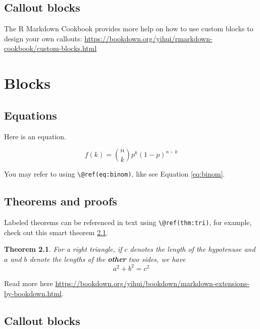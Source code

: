 \documentclass[
  10pt,
  b5paper,
  oneside]{book}
\newtheorem{theorem}{Theorem}[chapter]
\theoremstyle{definition}
\theoremstyle{definition}
\theoremstyle{definition}
\theoremstyle{definition}
\theoremstyle{remark}
\begin{document}
\hypertarget{callout-blocks}{%
\section{Callout blocks}\label{callout-blocks}}

The R Markdown Cookbook provides more help on how to use custom blocks to design your own callouts: \url{https://bookdown.org/yihui/rmarkdown-cookbook/custom-blocks.html}

\hypertarget{blocks-1}{%
\chapter{Blocks}\label{blocks-1}}

\hypertarget{equations-1}{%
\section{Equations}\label{equations-1}}

Here is an equation.

\begin{equation} 
  f\left(k\right) = \binom{n}{k} p^k\left(1-p\right)^{n-k}
  \label{eq:binom}
\end{equation}

You may refer to using \texttt{\textbackslash{}@ref(eq:binom)}, like see Equation \eqref{eq:binom}.

\hypertarget{theorems-and-proofs-1}{%
\section{Theorems and proofs}\label{theorems-and-proofs-1}}

Labeled theorems can be referenced in text using \texttt{\textbackslash{}@ref(thm:tri)}, for example, check out this smart theorem \ref{thm:tri}.

\begin{theorem}
\protect\hypertarget{thm:tri}{}\label{thm:tri}For a right triangle, if \(c\) denotes the \emph{length} of the hypotenuse
and \(a\) and \(b\) denote the lengths of the \textbf{other} two sides, we have
\[a^2 + b^2 = c^2\]
\end{theorem}

Read more here \url{https://bookdown.org/yihui/bookdown/markdown-extensions-by-bookdown.html}.

\hypertarget{callout-blocks-1}{%
\section{Callout blocks}\label{callout-blocks-1}}
\end{document}
